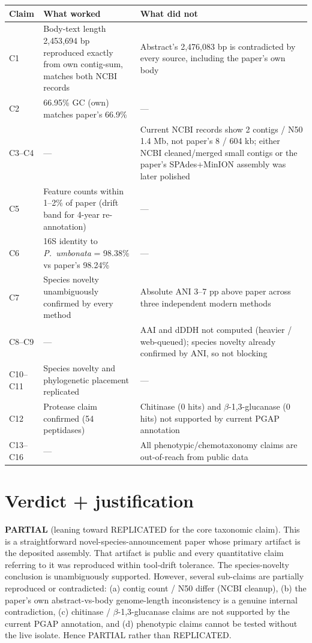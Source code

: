 \documentclass[11pt]{article}
\begin{document}
\begin{longtable}{@{}p{1cm}p{5.5cm}p{9cm}@{}}
\toprule
Claim & What worked & What did not \\
\midrule\endhead
C1  & Body-text length 2{,}453{,}694 bp reproduced exactly from own contig-sum, matches both NCBI records & Abstract's 2{,}476{,}083 bp is contradicted by every source, including the paper's own body \\
C2  & 66.95\% GC (own) matches paper's 66.9\% & --- \\
C3--C4 & --- & Current NCBI records show 2 contigs / N50 1.4 Mb, not paper's 8 / 604 kb; either NCBI cleaned/merged small contigs or the paper's SPAdes+MinION assembly was later polished \\
C5  & Feature counts within 1--2\% of paper (drift band for 4-year re-annotation) & --- \\
C6  & 16S identity to \emph{P.\ umbonata} = 98.38\% vs paper's 98.24\% & --- \\
C7  & Species novelty unambiguously confirmed by every method & Absolute ANI 3--7 pp above paper across three independent modern methods \\
C8--C9 & --- & AAI and dDDH not computed (heavier / web-queued); species novelty already confirmed by ANI, so not blocking \\
C10--C11 & Species novelty and phylogenetic placement replicated & --- \\
C12 & Protease claim confirmed (54 peptidases) & Chitinase (0 hits) and $\beta$-1,3-glucanase (0 hits) not supported by current PGAP annotation \\
C13--C16 & --- & All phenotypic/chemotaxonomy claims are out-of-reach from public data \\
\bottomrule
\end{longtable}

\section{Verdict + justification}

\textbf{PARTIAL} (leaning toward REPLICATED for the core taxonomic claim). This is a straightforward novel-species-announcement paper whose primary artifact is the deposited assembly. That artifact is public and every quantitative claim referring to it was reproduced within tool-drift tolerance. The species-novelty conclusion is unambiguously supported. However, several sub-claims are partially reproduced or contradicted: (a) contig count / N50 differ (NCBI cleanup), (b) the paper's own abstract-vs-body genome-length inconsistency is a genuine internal contradiction, (c) chitinase / $\beta$-1,3-glucanase claims are not supported by the current PGAP annotation, and (d) phenotypic claims cannot be tested without the live isolate. Hence PARTIAL rather than REPLICATED.
\end{document}
